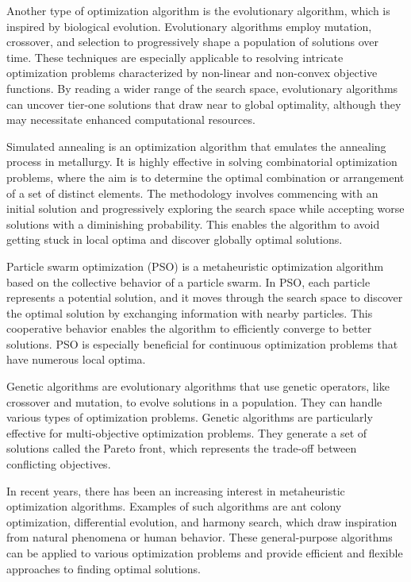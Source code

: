 Another type of optimization algorithm is the evolutionary algorithm, which is inspired by biological evolution. Evolutionary algorithms employ mutation, crossover, and selection to progressively shape a population of solutions over time. These techniques are especially applicable to resolving intricate optimization problems characterized by non-linear and non-convex objective functions. By reading a wider range of the search space, evolutionary algorithms can uncover tier-one solutions that draw near to global optimality, although they may necessitate enhanced computational resources.

Simulated annealing is an optimization algorithm that emulates the annealing process in metallurgy. It is highly effective in solving combinatorial optimization problems, where the aim is to determine the optimal combination or arrangement of a set of distinct elements. The methodology involves commencing with an initial solution and progressively exploring the search space while accepting worse solutions with a diminishing probability. This enables the algorithm to avoid getting stuck in local optima and discover globally optimal solutions.

Particle swarm optimization (PSO) is a metaheuristic optimization algorithm based on the collective behavior of a particle swarm. In PSO, each particle represents a potential solution, and it moves through the search space to discover the optimal solution by exchanging information with nearby particles. This cooperative behavior enables the algorithm to efficiently converge to better solutions. PSO is especially beneficial for continuous optimization problems that have numerous local optima.

Genetic algorithms are evolutionary algorithms that use genetic operators, like crossover and mutation, to evolve solutions in a population. They can handle various types of optimization problems. Genetic algorithms are particularly effective for multi-objective optimization problems. They generate a set of solutions called the Pareto front, which represents the trade-off between conflicting objectives.

In recent years, there has been an increasing interest in metaheuristic optimization algorithms. Examples of such algorithms are ant colony optimization, differential evolution, and harmony search, which draw inspiration from natural phenomena or human behavior. These general-purpose algorithms can be applied to various optimization problems and provide efficient and flexible approaches to finding optimal solutions.

